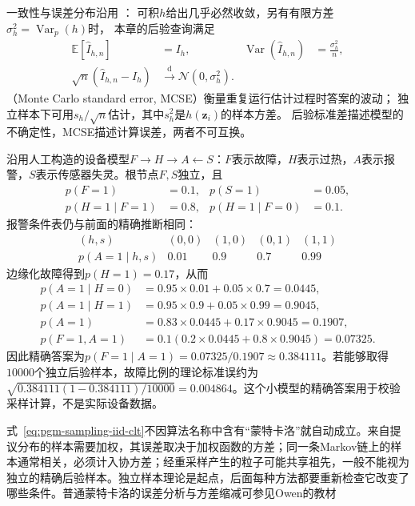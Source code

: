 一致性与误差分布沿用
：
可积$h$给出几乎必然收敛，另有有限方差$\sigma_h^2=\operatorname{Var}_p(h)$时，
本章的后验查询满足
\begin{equation}
  \begin{aligned}
    \mathbb{E}[\widehat I_{h,n}]&=I_h,&
    \operatorname{Var}(\widehat I_{h,n})&=\frac{\sigma_h^2}{n},\\
    \sqrt n(\widehat I_{h,n}-I_h)&\xrightarrow{\mathrm{d}}
      \mathcal{N}(0,\sigma_h^2).
  \end{aligned}
  \label{eq:pgm-sampling-iid-clt}
\end{equation}
（Monte Carlo standard error, MCSE）衡量重复运行估计过程时答案的波动；
独立样本下可用$s_h/\sqrt n$估计，其中$s_h^2$是$h(\bm z_i)$的样本方差。
后验标准差描述模型的不确定性，MCSE描述计算误差，两者不可互换。

\begin{example}[报警后的故障概率]
  \label{ex:pgm-sampling-device}
  沿用人工构造的设备模型$F\to H\to A\leftarrow S$：$F$表示故障，$H$表示过热，$A$表示报警，$S$表示传感器失灵。根节点$F,S$独立，且
  \[
    \begin{aligned}
      p(F=1)&=0.1,&p(S=1)&=0.05,\\
      p(H=1\mid F=1)&=0.8,&
      p(H=1\mid F=0)&=0.1.
    \end{aligned}
  \]
  报警条件表仍与前面的精确推断相同：
  \[
    \begin{array}{ccccc}
      (h,s)&(0,0)&(1,0)&(0,1)&(1,1)\\
      p(A=1\mid h,s)&0.01&0.9&0.7&0.99
    \end{array}
  \]
  边缘化故障得到$p(H=1)=0.17$，从而
  \[
    \begin{aligned}
      p(A=1\mid H=0)&=0.95\times0.01+0.05\times0.7=0.0445,\\
      p(A=1\mid H=1)&=0.95\times0.9+0.05\times0.99=0.9045,\\
      p(A=1)&=0.83\times0.0445+0.17\times0.9045=0.1907,\\
      p(F=1,A=1)&=0.1(0.2\times0.0445+0.8\times0.9045)=0.07325.
    \end{aligned}
  \]
  因此精确答案为$p(F=1\mid A=1)=0.07325/0.1907\approx0.384111$。若能够取得$10000$个独立后验样本，故障比例的理论标准误约为$\sqrt{0.384111(1-0.384111)/10000}=0.004864$。这个小模型的精确答案用于校验采样计算，不是实际设备数据。
\end{example}

式~\eqref{eq:pgm-sampling-iid-clt}不因算法名称中含有“蒙特卡洛”就自动成立。来自提议分布的样本需要加权，其误差取决于加权函数的方差；同一条Markov链上的样本通常相关，必须计入协方差；经重采样产生的粒子可能共享祖先，一般不能视为独立的精确后验样本。独立样本理论是起点，后面每种方法都要重新检查它改变了哪些条件。普通蒙特卡洛的误差分析与方差缩减可参见Owen的教材

